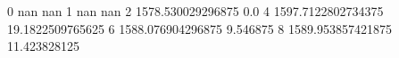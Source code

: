 0 nan nan
1 nan nan
2 1578.530029296875 0.0
4 1597.7122802734375 19.1822509765625
6 1588.076904296875 9.546875
8 1589.953857421875 11.423828125

